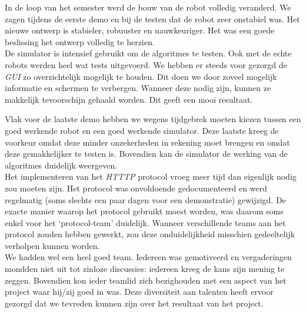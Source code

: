\documentclass[eind]{penoverslag}
\begin{document}
In de loop van het semester werd de bouw van de robot volledig veranderd. We zagen tijdens de eerste demo en bij de testen dat de robot zeer onstabiel was. Het nieuwe ontwerp is stabieler, robuuster en nauwkeuriger. Het was een goede beslissing het ontwerp volledig te herzien.\\

De simulator is intensief gebruikt om de algoritmes te testen. Ook met de echte robots werden heel wat tests uitgevoerd.
We hebben er steeds voor gezorgd de \textit{GUI} zo overzichtelijk mogelijk te houden. Dit doen we door zoveel mogelijk informatie en schermen te verbergen. Wanneer deze nodig zijn, kunnen ze makkelijk tevoorschijn gehaald worden. Dit geeft een mooi resultaat.

Vlak voor de laatste demo hebben we wegens tijdgebrek moeten kiezen tussen een goed werkende robot en een goed werkende simulator. Deze laatste kreeg de voorkeur omdat deze minder onzekerheden in rekening moet brengen en omdat deze gemakkelijker te testen is. Bovendien kan de simulator de werking van de algoritmes duidelijk weergeven.\\

Het implementeren van het \textit{HTTTP} protocol vroeg meer tijd dan eigenlijk nodig zou moeten zijn. Het protocol was onvoldoende gedocumenteerd en werd regelmatig (soms slechts een paar dagen voor een demonstratie) gewijzigd. De exacte manier waarop het protocol gebruikt moest worden, was daarom soms enkel voor het `protocol-team' duidelijk. Wanneer verschillende teams aan het protocol zouden hebben gewerkt, zou deze onduidelijkheid misschien gedeeltelijk verholpen kunnen worden.\\

We hadden wel een heel goed team. Iedereen was gemotiveerd en vergaderingen mondden niet uit tot zinloze discussies: iedereen kreeg de kans zijn mening te zeggen. Bovendien kon ieder teamlid zich bezighouden met een aspect van het project waar hij/zij goed in was. Deze diversiteit aan talenten heeft ervoor gezorgd dat we tevreden kunnen zijn over het resultaat van het project.
\end{document}

